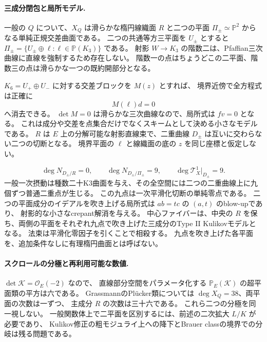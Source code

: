 \paragraph{三成分閉包と局所モデル.}
一般の $Q$ について、$X_Q$ は滑らかな楕円線織面 $R$ と二つの平面
$\Pi_\pm\simeq\mathbb P^2$ からなる単純正規交差曲面である。
二つの共通等方三平面を $U_\pm$ とすると
$\Pi_\pm=\{U_\pm\oplus\ell:\ell\in\mathbb P(K_3)\}$ である。
射影 $W\to K_3$ の階数二は、Pfaffian三次曲線に直線を強制するため存在しない。
階数一の点はちょうどこの二平面、階数三の点は滑らかな一つの既約開部分となる。

$K_6=U_+\oplus U_-$ に対する交差ブロックを $M(z)$ とすれば、
境界近傍で全方程式は正確に
\[
 M(\ell)d=0
\]
へ消去できる。
$\det M=0$ は滑らかな三次曲線なので、局所式は $fv=0$ となる。
これは成分や交差を点集合だけでなくスキームとして決める小さなモデルである。
$R$ は $E$ 上の分解可能な射影直線束で、二重曲線 $D_\pm$ は互いに交わらない二つの切断となる。
境界平面の $\ell$ と線織面の底の $z$ を同じ座標と仮定しない。

\[
 \deg N_{D_\pm/R}=0,\qquad
 \deg N_{D_\pm/\Pi_\pm}=9,\qquad
 \deg\mathcal T_X^1|_{D_\pm}=9.
\]
一般一次摂動は種数二十K3曲面を与え、その全空間には二つの二重曲線上に九個ずつ普通二重点が生じる。
この九点は一次平滑化切断の単純零点である。
二つの平面成分のイデアルを吹き上げる局所式は $ab=tc$ の $(a,t)$ のblow-upであり、
射影的な小さなcrepant解消を与える。
中心ファイバーは、中央の $R$ を保ち、両側の平面をそれぞれ九点で吹き上げた三成分のType II Kulikovモデルとなる。
法束は平滑化零因子を引くことで相殺する。
九点を吹き上げた各平面を、追加条件なしに有理楕円曲面とは呼ばない。

\paragraph{スクロールの分極と再利用可能な数値.}
$\det\mathcal K=\mathcal O_E(-2)$ なので、
直線部分空間をパラメータ化する $\mathbb P_E(\mathcal K)$ の超平面類の平方は六である。
GrassmannのPl\"ucker類については $\deg X_Q=38$、両平面の次数は一ずつ、
主成分 $R$ の次数は三十六である。
これら二つの分極を同一視しない。
一般関数体上で二平面を区別するには、前述の二次拡大 $L/K$ が必要であり、
Kulikov修正の粗モジュライ上への降下とBrauer classの境界での分岐は残る問題である。
